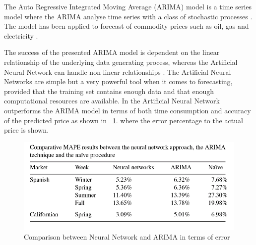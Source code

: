 The Auto Regressive Integrated Moving Average (ARIMA) model is a time series model where the ARIMA analyse time series with a class of stochastic processes \cite{EnergyPriceForecasting,ARIMA}. The model has been applied to forecast of commodity prices such as oil, gas and electricity \cite{ARIMA}. 

The success of the presented ARIMA model is dependent on the linear relationship of the underlying data generating process, whereas the Artificial Neural Network can handle non-linear relationships \cite{1}. The Artificial Neural Networks are simple but a very powerful tool when it comes to forecasting, provided that the training set contains enough data and that enough computational resources are available. 
In \cite{1} the Artificial Neural Network outperforms the ARIMA model in terms of both time consumption and accuracy of the predicted price as shown in ~\ref{fig:ArimaVSNN}. where the error percentage to the actual price is shown.
\begin{figure}[h!]
\centering
\includegraphics[width=0.8\linewidth,natwidth=898,natheight=587]{billeder/ARIMAvsNN.png}
\caption{Comparison between Neural Network and ARIMA in terms of error \cite{1}}
\label{fig:ArimaVSNN}
\end{figure}